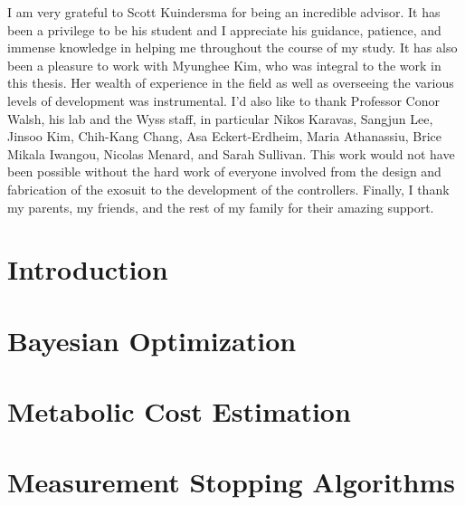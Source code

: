 \documentclass[11pt]{gsasthesis} %
\begin{document}
\listoftables
\listoffigures
\listofalgorithms
\begin{acknowledgments}
  I am very grateful to Scott Kuindersma for being an incredible advisor. It has been a privilege to be his student and I appreciate his guidance, patience, and immense knowledge in helping me throughout the course of my study. It has also been a pleasure to work with Myunghee Kim, who was integral to the work in this thesis. Her wealth of experience in the field as well as overseeing the various levels of development was instrumental. I'd also like to thank Professor Conor Walsh, his lab and the Wyss staff, in particular Nikos Karavas, Sangjun Lee, Jinsoo Kim, Chih-Kang Chang, Asa Eckert-Erdheim, Maria Athanassiu, Brice Mikala Iwangou, Nicolas Menard, and Sarah Sullivan. This work would not have been possible without the hard work of everyone involved from the design and fabrication of the exosuit to the development of the controllers. Finally, I thank my parents, my friends, and the rest of my family for their amazing support.
\end{acknowledgments}



\chapter*{Introduction}\label{ch:intro}


\chapter{Bayesian Optimization}\label{ch:1}


\chapter{Metabolic Cost Estimation}\label{ch:2}


\chapter{Measurement Stopping Algorithms}\label{ch:3}

\end{document}
